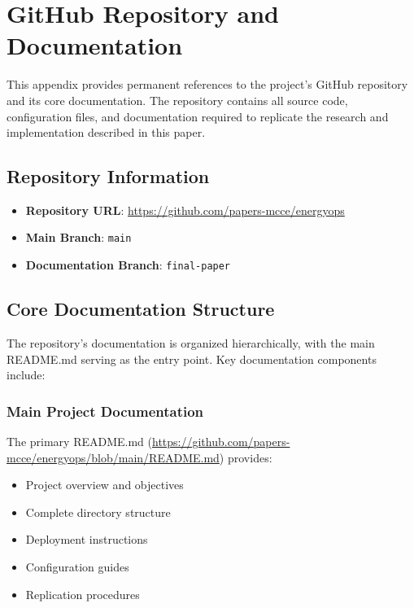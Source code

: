 \newpage
\section{GitHub Repository and Documentation}
\label{appendix:github-docs}

This appendix provides permanent references to the project's GitHub repository and its core documentation. The repository contains all source code, configuration files, and documentation required to replicate the research and implementation described in this paper.

\subsection{Repository Information}
\begin{itemize}
    \item \textbf{Repository URL}: \url{https://github.com/papers-mcce/energyops}
    \item \textbf{Main Branch}: \texttt{main}
    \item \textbf{Documentation Branch}: \texttt{final-paper}
\end{itemize}

\subsection{Core Documentation Structure}
The repository's documentation is organized hierarchically, with the main README.md serving as the entry point. Key documentation components include:

\subsubsection{Main Project Documentation}
The primary README.md (\url{https://github.com/papers-mcce/energyops/blob/main/README.md}) provides:
\begin{itemize}
    \item Project overview and objectives
    \item Complete directory structure
    \item Deployment instructions
    \item Configuration guides
    \item Replication procedures
\end{itemize}

